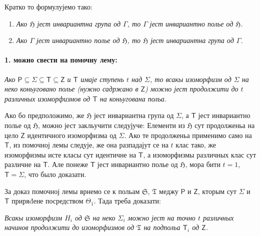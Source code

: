 \documentclass[11pt]{article}
\begin{document}
Кратко то формулујемо тако:

\begin{enumerate}
\item \emph{Ако \(\mathfrak H\) јест инвариантна група од \(\Gamma\), то \(\Gamma\) јест инвариантно полье од \(\mathfrak H\).}
\item \emph{Ако \(\Gamma\) јест инвариантно полье од \(\mathfrak H\), то \(\mathfrak H\) јест инвариантна група од \(\Gamma\).}
\end{enumerate}

\paragraph{1. можно свести на помочну лему:}\label{laesst-sich-zurueckfuehren-auf-den-hilfssatz}

\emph{Ако \(\mathsf P \subseteq \Sigma \subseteq \mathsf T \subseteq \mathsf Z\) и \(\mathsf T\) имаје ступень \(t\) над \(\Sigma\), то всакы изоморфизм од \(\Sigma\) на неко коньуговано полье (нужно садржано в \(\mathsf Z\)) можно јест продолжити до \(t\) различных изоморфизмов од \(\mathsf T\) на коньугована польа.}

Ако бо предположимо, же \(\mathfrak H\) јест инвариантна група од \(\Sigma\), а \(\mathsf T\) јест инвариантно полье од \(\mathfrak H\), можно јест закльучити следујуче: Елементи из \(\mathfrak H\) сут продолженьа на цело \(\mathsf Z\) идентичного изоморфизма од \(\Sigma\). Ако те продолженьа применимо само на \(\mathsf T\), из помочној лемы следује, же она разпадајут се на \(t\) клас тако, же изоморфизмы исте класы сут идентичне на \(\mathsf T\), а изоморфизмы различных клас сут различне на \(\mathsf T\). Але понеже \(\mathsf T\) јест инвариантно полье од \(\mathfrak H\), мора бити \(t=1\), \(\mathsf T=\Sigma\), что было доказати.

За доказ помочној лемы врнемо се к польам \(\mathfrak S\), \(\mathfrak T\) меджу \(\mathsf P\) и \(\mathsf Z\), кторым сут \(\Sigma\) и \(\mathsf T\) приряđене посредством \(\Theta_1\). Тада треба доказати:

\emph{Всакы изоморфизм \(H_i\) од \(\mathfrak S\) на неко \(\Sigma_i\) можно јест на точно \(t\) различных начинов продолжити до изоморфизмов од \(\mathfrak T\) на подпольа \(\mathsf T_i\) од \(\mathsf Z\).}
\end{document}
